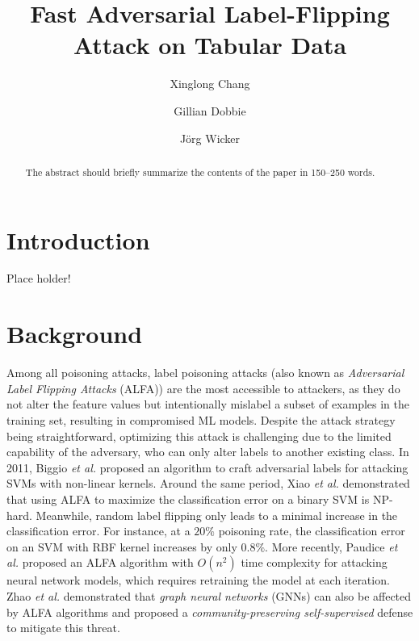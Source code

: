 \documentclass[runningheads]{llncs}
\begin{document}
%
\title{Fast Adversarial Label-Flipping Attack on Tabular Data}
%
%
\author{
    Xinglong Chang \and
    Gillian Dobbie \and
    J\"org Wicker
}
%
%
%
\maketitle              %
%
\begin{abstract}
The abstract should briefly summarize the contents of the paper in
150--250 words.

\end{abstract}


\section{Introduction}

Place holder!


\section{Background}
\label{sec:background}

Among all poisoning attacks, label poisoning attacks (also known as \emph{Adversarial Label Flipping Attacks} (ALFA)) are the most accessible to attackers, as they do not alter the feature values but intentionally mislabel a subset of examples in the training set, resulting in compromised ML models.
Despite the attack strategy being straightforward, optimizing this attack is challenging due to the limited capability of the adversary, who can only alter labels to another existing class.
In 2011, Biggio \emph{et al.} \cite{biggio2011support} proposed an algorithm to craft adversarial labels for attacking SVMs with non-linear kernels.
Around the same period, Xiao \emph{et al.} \cite{xiao2012adversarial} demonstrated that using ALFA to maximize the classification error on a binary SVM is NP-hard.
Meanwhile, random label flipping only leads to a minimal increase in the classification error.
For instance, at a $20\%$ poisoning rate, the classification error on an SVM with RBF kernel increases by only $0.8\%$.
More recently, Paudice \emph{et al.} \cite{paudice2018label} proposed an ALFA algorithm with $O(n^2)$ time complexity for attacking neural network models, which requires retraining the model at each iteration.
Zhao \emph{et al.} \cite{zhang2020adversarial} demonstrated that \emph{graph neural networks} (GNNs) can also be affected by ALFA algorithms and proposed a \emph{community-preserving self-supervised} defense to mitigate this threat.
\end{document}
